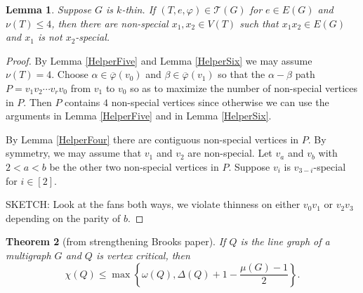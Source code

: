 \documentclass[12pt]{amsart}
\theoremstyle{plain}
\newtheorem{thm}{Theorem}
\newtheorem{lem}[thm]{Lemma}
\theoremstyle{definition}
\theoremstyle{remark}
\newcommand{\fancy}[1]{\mathcal{#1}}
\newcommand{\T}{\fancy{T}}
\newcommand{\irange}[1]{\left[#1\right]}
\newcommand{\vph}{\varphi}
\newcommand{\vphn}{\overline{\varphi}}
\begin{document}
\begin{lem}\label{HelperSeven}
Suppose $G$ is $k$-thin. If $(T, e, \vph) \in \T(G)$ for $e \in E(G)$ and $\nu(T) \le 4$, then there are non-special $x_1,x_2 \in V(T)$ such that $x_1x_2 \in E(G)$ and $x_1$ is not $x_2$-special.
\end{lem}
\begin{proof}
By Lemma \ref{HelperFive} and Lemma \ref{HelperSix} we may assume $\nu(T) = 4$. 
Choose $\alpha \in \vphn(v_0)$ and $\beta \in \vphn(v_1)$ so that the $\alpha-\beta$ path $P = v_1v_2\cdots v_rv_0$ from $v_1$ to $v_0$ so as to maximize the number of non-special vertices in $P$.
Then $P$ contains $4$ non-special vertices since otherwise we can use the arguments in Lemma \ref{HelperFive} and in Lemma \ref{HelperSix}.

By Lemma \ref{HelperFour} there are contiguous non-special vertices in $P$.  By symmetry, we may assume that $v_1$ and $v_2$ are non-special.  Let $v_a$ and $v_b$ with $2 < a < b$ be the other two non-special vertices in $P$.
Suppose $v_i$ is $v_{3-i}$-special for $i \in \irange{2}$.  

SKETCH: Look at the fans both ways, we violate thinness on either $v_0v_1$ or $v_2v_3$ depending on the parity of $b$.
\end{proof}

\begin{thm}[from strengthening Brooks paper]\label{CriticalMuBound}
If $Q$ is the line graph of a multigraph $G$ and $Q$ is vertex critical, then
\[\chi(Q) \leq \max\left\{\omega(Q), \Delta(Q) + 1 - \frac{\mu(G) - 1}{2}\right\}.\]
\end{thm}
\end{document}
